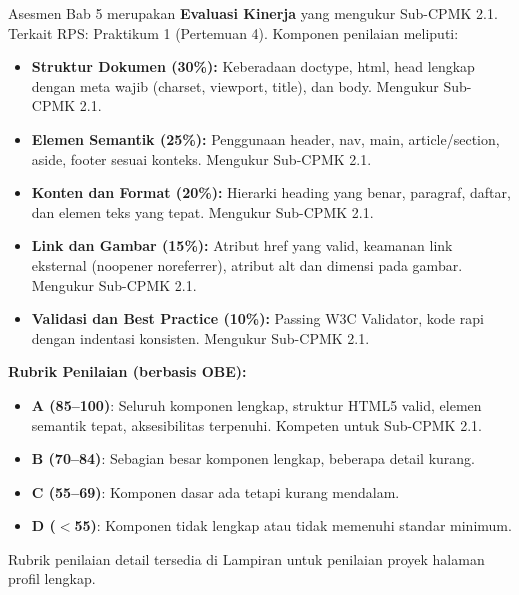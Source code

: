 \documentclass[../main.tex]{subfiles}
\begin{document}
\begin{asesmen}
Asesmen Bab 5 merupakan \textbf{Evaluasi Kinerja} yang mengukur Sub-CPMK 2.1. Terkait RPS: Praktikum 1 (Pertemuan 4). Komponen penilaian meliputi:

\begin{itemize}[leftmargin=*]
  \item \textbf{Struktur Dokumen (30\%):} Keberadaan doctype, html, head lengkap dengan meta wajib (charset, viewport, title), dan body. Mengukur Sub-CPMK 2.1.
  \item \textbf{Elemen Semantik (25\%):} Penggunaan header, nav, main, article/section, aside, footer sesuai konteks. Mengukur Sub-CPMK 2.1.
  \item \textbf{Konten dan Format (20\%):} Hierarki heading yang benar, paragraf, daftar, dan elemen teks yang tepat. Mengukur Sub-CPMK 2.1.
  \item \textbf{Link dan Gambar (15\%):} Atribut href yang valid, keamanan link eksternal (noopener noreferrer), atribut alt dan dimensi pada gambar. Mengukur Sub-CPMK 2.1.
  \item \textbf{Validasi dan Best Practice (10\%):} Passing W3C Validator, kode rapi dengan indentasi konsisten. Mengukur Sub-CPMK 2.1.
\end{itemize}

\textbf{Rubrik Penilaian (berbasis OBE):}
\begin{itemize}
  \item \textbf{A (85--100)}: Seluruh komponen lengkap, struktur HTML5 valid, elemen semantik tepat, aksesibilitas terpenuhi. Kompeten untuk Sub-CPMK 2.1.
  \item \textbf{B (70--84)}: Sebagian besar komponen lengkap, beberapa detail kurang.
  \item \textbf{C (55--69)}: Komponen dasar ada tetapi kurang mendalam.
  \item \textbf{D ($<$55)}: Komponen tidak lengkap atau tidak memenuhi standar minimum.
\end{itemize}

Rubrik penilaian detail tersedia di Lampiran untuk penilaian proyek halaman profil lengkap.
\end{asesmen}
\end{document}
